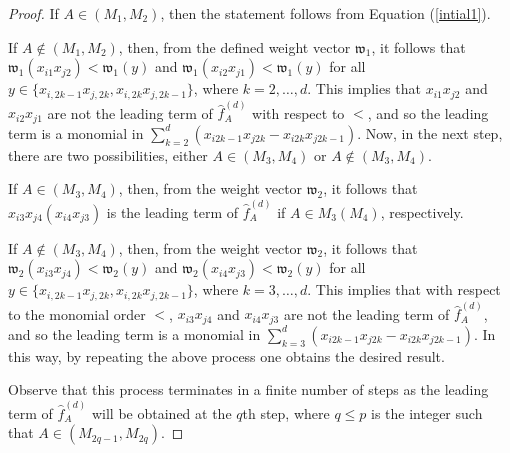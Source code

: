 \documentclass[11pt,a4paper,reqno]{amsart}
\theoremstyle{definition}
\numberwithin{equation}{section}
\begin{document}
\begin{proof}
If $A \in (M_{1},M_{2})$, then the statement follows from Equation (\ref{intial1}).

If $A \notin (M_{1},M_{2})$, then, from the defined weight vector $\mathfrak{w}_{1}$, it follows that $\mathfrak{w}_{1}(x_{i1}x_{j2})<\mathfrak{w}_{1}(y)$ and $\mathfrak{w}_{1}(x_{i2}x_{j1})<\mathfrak{w}_{1}(y)$ for all $y \in \{x_{i,2k-1}x_{j,2k},x_{i,2k}x_{j,2k-1}\}$, where $k=2,\ldots, d$. This implies that $x_{i1}x_{j2}$ and $x_{i2}x_{j1}$ are not the leading term of $\hat{f}_A^{(d)}$ with respect to $<$, and so the leading term is a monomial in $\sum_{k=2}^d(x_{i2k-1}x_{j2k}-x_{i2k}x_{j2k-1})$. Now, in the next step, there are two possibilities, either $A \in (M_{3},M_{4})$ or $A \notin (M_{3},M_{4})$. 

If $A \in (M_{3},M_{4})$, then, from the weight vector $\mathfrak{w}_{2}$, it follows that $x_{i3}x_{j4} (x_{i4}x_{j3})$ is the leading term of $\hat{f}_A^{(d)}$ if $A \in M_3 (M_4)$, respectively. 

If $A \notin (M_{3},M_{4})$, then, from the weight vector $\mathfrak{w}_{2}$, it follows that $\mathfrak{w}_{2}(x_{i3}x_{j4})<\mathfrak{w}_{2}(y)$ and $\mathfrak{w}_{2}(x_{i4}x_{j3})<\mathfrak{w}_{2}(y)$ for all $y \in \{x_{i,2k-1}x_{j,2k},x_{i,2k}x_{j,2k-1}\}$, where $k=3,\ldots, d$. This implies that with respect to the monomial order $<$, $x_{i3}x_{j4}$ and $x_{i4}x_{j3}$ are not the leading term of $\hat{f}_A^{(d)}$, and so the leading term is a monomial in $\sum_{k=3}^d(x_{i2k-1}x_{j2k}-x_{i2k}x_{j2k-1})$. 
In this way, by repeating the above process one obtains the desired result. 

Observe that this process terminates in a finite number of steps as the leading term of $\hat{f}_A^{(d)}$ will be obtained at the $q$th step, where $q \leq p$ is the integer such that $A \in (M_{2q-1},M_{2q})$.
\end{proof}
\end{document}
